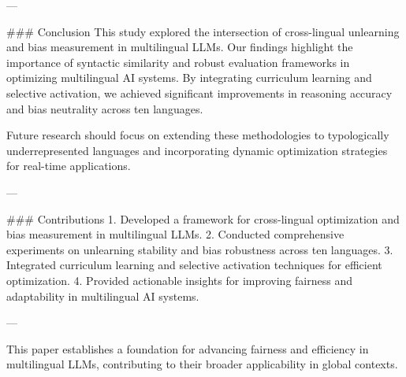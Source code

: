 ---

### Conclusion  
This study explored the intersection of cross-lingual unlearning and bias measurement in multilingual LLMs. Our findings highlight the importance of syntactic similarity and robust evaluation frameworks in optimizing multilingual AI systems. By integrating curriculum learning and selective activation, we achieved significant improvements in reasoning accuracy and bias neutrality across ten languages.

Future research should focus on extending these methodologies to typologically underrepresented languages and incorporating dynamic optimization strategies for real-time applications.

---

### Contributions  
1. Developed a framework for cross-lingual optimization and bias measurement in multilingual LLMs.  
2. Conducted comprehensive experiments on unlearning stability and bias robustness across ten languages.  
3. Integrated curriculum learning and selective activation techniques for efficient optimization.  
4. Provided actionable insights for improving fairness and adaptability in multilingual AI systems.

--- 

This paper establishes a foundation for advancing fairness and efficiency in multilingual LLMs, contributing to their broader applicability in global contexts.
